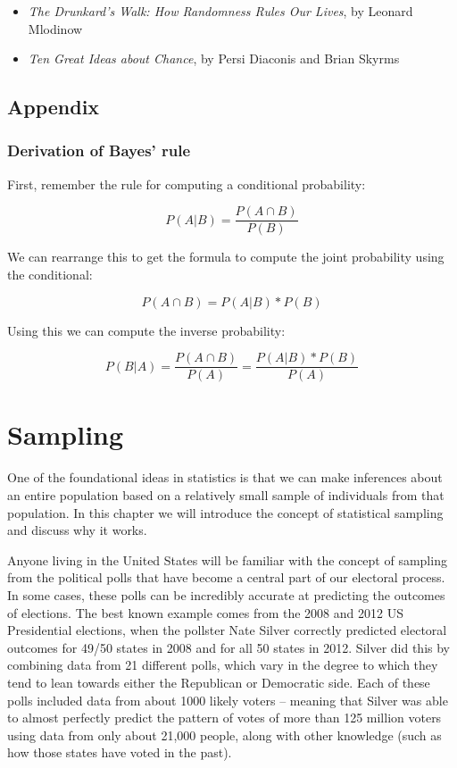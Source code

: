 \documentclass[
  12pt,
]{book}
\providecommand{\tightlist}{%
  \setlength{\itemsep}{0pt}\setlength{\parskip}{0pt}}
\begin{document}
\begin{itemize}
\tightlist
\item
  \emph{The Drunkard's Walk: How Randomness Rules Our Lives}, by Leonard Mlodinow
\item
  \emph{Ten Great Ideas about Chance}, by Persi Diaconis and Brian Skyrms
\end{itemize}

\hypertarget{appendix-2}{%
\section{Appendix}\label{appendix-2}}

\hypertarget{derivation-of-bayes-rule}{%
\subsection{Derivation of Bayes' rule}\label{derivation-of-bayes-rule}}

First, remember the rule for computing a conditional probability:

\[
P(A|B) = \frac{P(A \cap B)}{P(B)}
\]

We can rearrange this to get the formula to compute the joint probability using the conditional:

\[
P(A \cap B) = P(A|B) * P(B)
\]

Using this we can compute the inverse probability:

\[
P(B|A) = \frac{P(A \cap B)}{P(A)} =   \frac{P(A|B)*P(B)}{P(A)}
\]

\hypertarget{sampling}{%
\chapter{Sampling}\label{sampling}}

One of the foundational ideas in statistics is that we can make inferences about an entire population based on a relatively small sample of individuals from that population. In this chapter we will introduce the concept of statistical sampling and discuss why it works.

Anyone living in the United States will be familiar with the concept of sampling from the political polls that have become a central part of our electoral process. In some cases, these polls can be incredibly accurate at predicting the outcomes of elections. The best known example comes from the 2008 and 2012 US Presidential elections, when the pollster Nate Silver correctly predicted electoral outcomes for 49/50 states in 2008 and for all 50 states in 2012. Silver did this by combining data from 21 different polls, which vary in the degree to which they tend to lean towards either the Republican or Democratic side. Each of these polls included data from about 1000 likely voters -- meaning that Silver was able to almost perfectly predict the pattern of votes of more than 125 million voters using data from only about 21,000 people, along with other knowledge (such as how those states have voted in the past).
\end{document}
